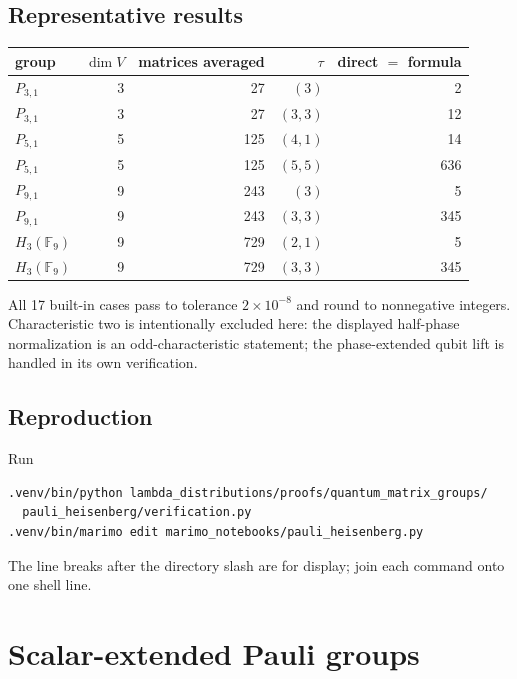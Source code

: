 \documentclass[10pt]{article}
\newcommand{\SMG}{\operatorname{SMG}}
\newcommand{\F}{\mathbb F}
\begin{document}
\subsection{Representative results}
\begin{center}
\begin{tabular}{@{}lrrrr@{}}\toprule
group & $\dim V$ & matrices averaged & $\tau$ & direct $=$ formula\\\midrule
$P_{3,1}$ &3&27&$(3)$&2\\
$P_{3,1}$ &3&27&$(3,3)$&12\\
$P_{5,1}$ &5&125&$(4,1)$&14\\
$P_{5,1}$ &5&125&$(5,5)$&636\\
$P_{9,1}$ &9&243&$(3)$&5\\
$P_{9,1}$ &9&243&$(3,3)$&345\\
$H_3(\F_9)$ &9&729&$(2,1)$&5\\
$H_3(\F_9)$ &9&729&$(3,3)$&345\\\bottomrule
\end{tabular}
\end{center}
All 17 built-in cases pass to tolerance $2\times10^{-8}$ and round to
nonnegative integers.  Characteristic two is intentionally excluded here:
the displayed half-phase normalization is an odd-characteristic statement;
the phase-extended qubit lift is handled in its own verification.

\subsection{Reproduction}
Run
\begin{verbatim}
.venv/bin/python lambda_distributions/proofs/quantum_matrix_groups/
  pauli_heisenberg/verification.py
.venv/bin/marimo edit marimo_notebooks/pauli_heisenberg.py
\end{verbatim}
The line breaks after the directory slash are for display; join each command
onto one shell line.
\endgroup


\clearpage
\section{Scalar-extended Pauli groups}\label{proof:scalar-pauli}
\begingroup
{}
\providecommand{\Sgm}{\SMG}
\renewcommand{\Sgm}{\SMG}
\setcounter{theorem}{0}
\setcounter{proposition}{0}
\setcounter{lemma}{0}
\setcounter{corollary}{0}
\setcounter{remark}{0}
\begin{abstract}
Building on Theorem A(3) of the 14 July paper, we prove the coefficient form of the scalar-extended Pauli formula and test
the complete matrix groups $\mu_4P_{2,1}$, $\mu_4P_{2,2}$, and
$\mu_6P_{3,1}$.  All 13 representative checks pass.  The calculation also
locates a sign error in the supplied qubit-recovery prose: equation (13)
specializes with a positive, projected noncentral sector, not a minus sign.
\end{abstract}
\end{document}
